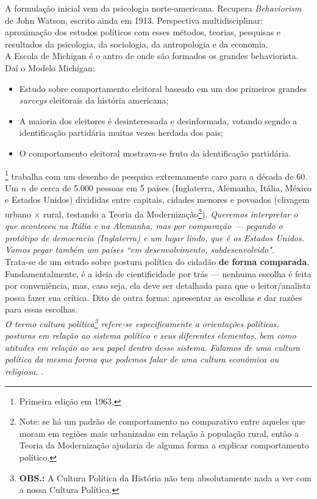\noindent A formulação inicial vem da psicologia norte-americana. Recupera \textit{Behaviorism} de John Watson, escrito ainda em 1913. Perspectiva multidisciplinar: aproximação dos estudos políticos com esses métodos, teorias, pesquisas e resultados da psicologia, da sociologia, da antropologia e da economia. \\

\noindent A Escola de Michigan é o antro de onde são formados os grandes behaviorista. Daí o Modelo Michigan: 

\begin{itemize}
    \item Estudo sobre comportamento eleitoral baseado em um dos primeiros grandes \textit{surveys} eleitorais da história americana;
    \item A maioria dos eleitores é desinteressada e desinformada, votando segndo a identificação partidária muitas vezes herdada dos pais;
    \item O comportamento eleitoral mostrava-se fruto da identificação partidária.
\end{itemize}

\noindent {}\footnote{Primeira edição em 1963.} trabalha com um desenho de pesquisa extremamente caro para a década de 60. Um $n$ de cerca de 5.000 pessoas em 5 países (Inglaterra, Alemanha, Itália, México e Estados Unidos) divididas entre capitais, cidades menores e povoados (clivagem urbano $\times$ rural, testando a Teoria da Modernização\footnote{Note: se há um padrão de comportamento no comparativo entre aqueles que moram em regiões mais urbanizadas em relação à população rural, então a Teoria da Modernização ajudaria de alguma forma a explicar comportamento político.}). \textit{Queremos interpretar o que aconteceu na Itália e na Alemanha, mas por comparação --- pegando o protótipo de democracia (Inglaterra) e um lugar lindo, que é os Estados Unidos. Vamos pegar também um países ``em desenvolvimento, subdesenvolvido".} \\ 

\noindent Trata-se de um estudo sobre postura política do cidadão \textbf{de forma comparada}. Fundamentalmente, é a ideia de cientificidade por trás --- nenhuma escolha é feita por conveniência, mas, caso seja, ela deve ser detalhada para que o leitor/analista possa fazer sua crítica. Dito de outra forma: apresentar as escolhas e dar razões para essas escolhas. \\

\noindent \textit{O termo cultura política\footnote{\textbf{OBS.:} A Cultura Política da História não tem absolutamente nada a ver com a nossa Cultura Política.} refere-se especificamente a orientações políticas, posturas em relação ao sistema político e seus diferentes elementos, bem como atitudes em relação ao seu papel dentro desse sistema. Falamos de uma cultura política da mesma forma que podemos falar de uma cultura econômica ou religiosa.} \cite[~p. 30]{almond_1970}. \\

